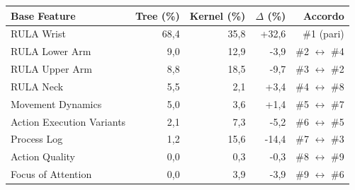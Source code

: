 \begin{tabular*}{\linewidth}{@{}l@{\extracolsep{\fill}}rrrr@{}}
\toprule
\textbf{Base Feature} & \textbf{Tree (\%)} & \textbf{Kernel (\%)} & \textbf{$\Delta$ (\%)} & \textbf{Accordo} \\
\midrule
RULA Wrist & 68{,}4 & 35{,}8 & +32{,}6 & \#1 (pari) \\
RULA Lower Arm & 9{,}0 & 12{,}9 & -3{,}9 & \#2 $\leftrightarrow$ \#4 \\
RULA Upper Arm & 8{,}8 & 18{,}5 & -9{,}7 & \#3 $\leftrightarrow$ \#2 \\
RULA Neck & 5{,}5 & 2{,}1 & +3{,}4 & \#4 $\leftrightarrow$ \#8 \\
Movement Dynamics & 5{,}0 & 3{,}6 & +1{,}4 & \#5 $\leftrightarrow$ \#7 \\
Action Execution Variants & 2{,}1 & 7{,}3 & -5{,}2 & \#6 $\leftrightarrow$ \#5 \\
Process Log & 1{,}2 & 15{,}6 & -14{,}4 & \#7 $\leftrightarrow$ \#3 \\
Action Quality & 0{,}0 & 0{,}3 & -0{,}3 & \#8 $\leftrightarrow$ \#9 \\
Focus of Attention & 0{,}0 & 3{,}9 & -3{,}9 & \#9 $\leftrightarrow$ \#6 \\
\bottomrule
\end{tabular*}
